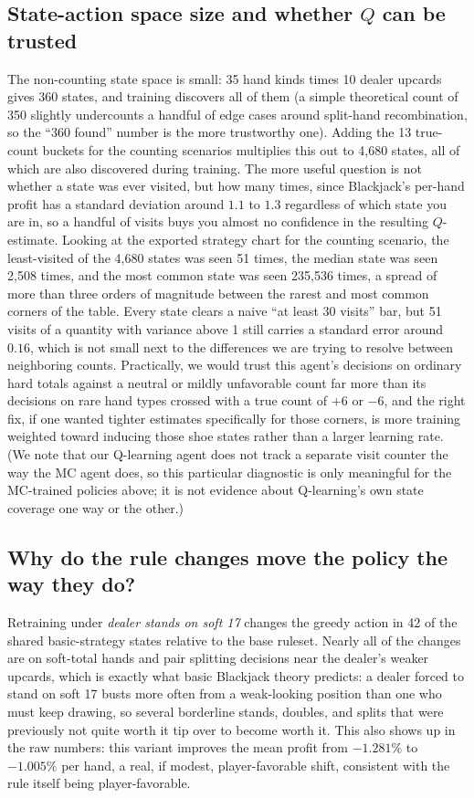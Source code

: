 \documentclass[conference,a4paper]{IEEEtran}
\begin{document}
\subsection{State-action space size and whether $Q$ can be trusted}
The non-counting state space is small: 35 hand kinds times 10 dealer
upcards gives 360 states, and training discovers all of them (a simple
theoretical count of 350 slightly undercounts a handful of edge cases around
split-hand recombination, so the ``360 found'' number is the more trustworthy
one). Adding the 13 true-count buckets for the counting scenarios multiplies
this out to 4{,}680 states, all of which are also discovered during
training. The more useful question is not whether a state was ever visited,
but how many times, since Blackjack's per-hand profit has a standard
deviation around $1.1$ to $1.3$ regardless of which state you are in, so a
handful of visits buys you almost no confidence in the resulting
$Q$-estimate. Looking at the exported strategy chart for the counting
scenario, the least-visited of the 4{,}680 states was seen 51 times, the
median state was seen 2{,}508 times, and the most common state was seen
235{,}536 times, a spread of more than three orders of magnitude between
the rarest and most common corners of the table. Every state clears a
naive ``at least 30 visits'' bar, but 51 visits of a quantity with variance
above 1 still carries a standard error around $0.16$, which is not small
next to the differences we are trying to resolve between neighboring
counts. Practically, we would trust this agent's decisions on ordinary hard
totals against a neutral or mildly unfavorable count far more than its
decisions on rare hand types crossed with a true count of $+6$ or $-6$, and
the right fix, if one wanted tighter estimates specifically for those
corners, is more training weighted toward inducing those shoe states rather
than a larger learning rate. (We note that our Q-learning agent does not
track a separate visit counter the way the MC agent does, so this particular
diagnostic is only meaningful for the MC-trained policies above; it is not
evidence about Q-learning's own state coverage one way or the other.)

\subsection{Why do the rule changes move the policy the way they do?}
\label{sec:rule-effects}
Retraining under \emph{dealer stands on soft 17} changes the greedy action
in 42 of the shared basic-strategy states relative to the base ruleset.
Nearly all of the changes are on soft-total hands and pair splitting
decisions near the dealer's weaker upcards, which is exactly what basic
Blackjack theory predicts: a dealer forced to stand on soft 17 busts more
often from a weak-looking position than one who must keep drawing, so
several borderline stands, doubles, and splits that were previously not
quite worth it tip over to become worth it. This also shows up in the raw
numbers: this variant improves the mean profit from $-1.281\%$ to $-1.005\%$
per hand, a real, if modest, player-favorable shift, consistent with the
rule itself being player-favorable.
\end{document}
